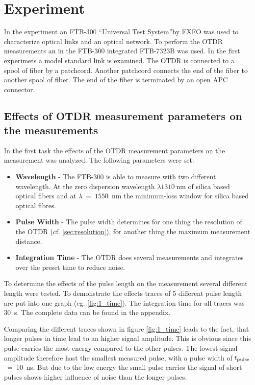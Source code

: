 \chapter{Experiment}
\label{ch:exp}
In the experiment an FTB-300 ``Universal Test System''by EXFO was used to characterize optical links and an optical network. To perform the OTDR measurements an in the FTB-300 integrated FTB-7323B was used. In the first experimets a model standard link is examined. The OTDR is connected to a spool of fiber by a patchcord. Another patchcord connects the end of the fiber to another spool of fiber. The end of the fiber is terminated by an open APC connector. 

\section{Effects of OTDR measurement parameters on the measurements}
In the first task the effects of the OTDR measurement parameters on the measurement was analyzed. 
The following parameters were set:
\begin{itemize}
	\item \textbf{Wavelength} - The FTB-300 is able to measure with two different wavelength. At the zero dispersion wavelength $\lambda 1310~$nm  of silica based optical fibers and at $\lambda~=~1550$~nm the minimum-loss window for silica based optical fibres.
	\item \textbf{Pulse Width} - The pulse width determines for one thing the resolution of the OTDR (cf. \ref{sec:resolution}), for another thing the maximum measurement distance. 
	\item \textbf{Integration Time} - The OTDR does several measurements and integrates over the preset time to reduce noise. 
\end{itemize}

To determine the effects of the pulse length on the measurement several different length were tested. To demonstrate the effects traces of 5 different pulse length are put into one graph (eg. \ref{fig:1_time}). The integration time for all traces was 30~s. The complete data can be found in the appendix.

Comparing the different traces shown in figure \ref{fig:1_time} leads to the fact, that longer pulses in time lead to an higher signal amplitude. This is obvious since this pulse carries the most energy compared to the other pulses. 
The lowest signal amplitude therefore hast the smallest measured pulse, with a pulse width of $t_{\mathrm{pulse}}$~=~10~ns. But due to the low energy the small pulse carries the signal of short pulses shows higher influence of noise than the longer pulses. 

